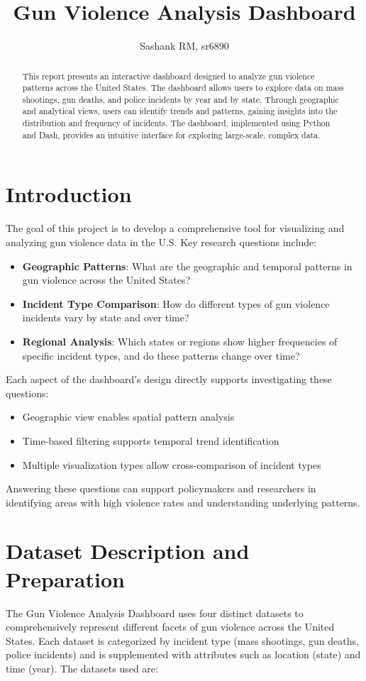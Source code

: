 \documentclass{article}
\title{Gun Violence Analysis Dashboard}
\author{Sashank RM, sr6890}
\date{}
\begin{document}
\maketitle

\begin{abstract}
This report presents an interactive dashboard designed to analyze gun violence patterns across the United States. The dashboard allows users to explore data on mass shootings, gun deaths, and police incidents by year and by state. Through geographic and analytical views, users can identify trends and patterns, gaining insights into the distribution and frequency of incidents. The dashboard, implemented using Python and Dash, provides an intuitive interface for exploring large-scale, complex data.
\end{abstract}

\section{Introduction}
The goal of this project is to develop a comprehensive tool for visualizing and analyzing gun violence data in the U.S. Key research questions include:
\begin{itemize}
    \item \textbf{Geographic Patterns}: What are the geographic and temporal patterns in gun violence across the United States?
    \item \textbf{Incident Type Comparison}: How do different types of gun violence incidents vary by state and over time?
    \item \textbf{Regional Analysis}: Which states or regions show higher frequencies of specific incident types, and do these patterns change over time?
\end{itemize}

Each aspect of the dashboard's design directly supports investigating these questions:
\begin{itemize}
    \item Geographic view enables spatial pattern analysis
    \item Time-based filtering supports temporal trend identification
    \item Multiple visualization types allow cross-comparison of incident types
\end{itemize}
Answering these questions can support policymakers and researchers in identifying areas with high violence rates and understanding underlying patterns.

\section{Dataset Description and Preparation}
The Gun Violence Analysis Dashboard uses four distinct datasets to comprehensively represent different facets of gun violence across the United States. Each dataset is categorized by incident type (mass shootings, gun deaths, police incidents) and is supplemented with attributes such as location (state) and time (year). The datasets used are:
\end{document}
